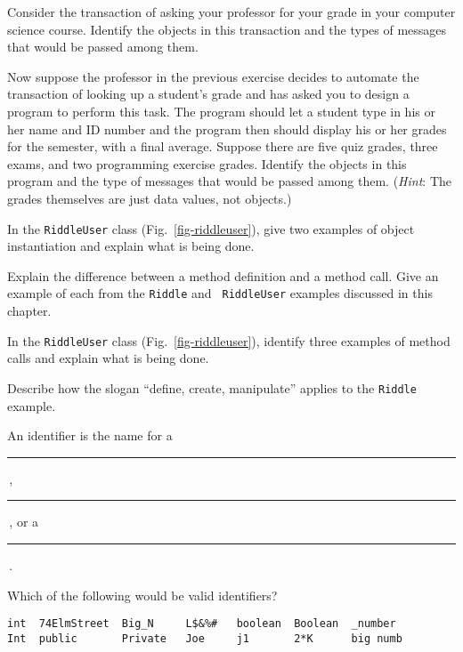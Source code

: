 \begin{EXRtwo}
\item  Consider the transaction of asking your professor for
your grade in your computer science course.  Identify the objects in
this transaction and the types of messages that would be passed among them.

\item  Now suppose the professor in the previous exercise decides
to automate the transaction of looking up a student's grade and has
asked you to design a program to perform this task. The program should
let a student type in his or her name and ID number and the program
then should display his or her grades for the semester, with a final
average. Suppose there are five quiz grades, three exams, and two
programming exercise grades.  Identify the objects in this program and the type of
messages that would be passed among them. ({\it Hint}: The grades
themselves are just data values, not objects.)

\item  In the {\tt RiddleUser} class (Fig.~\ref{fig-riddleuser}),
give two examples of object instantiation and explain what is being
done.

\item  Explain the difference between a method definition and
a method call. Give an example of each from the {\tt Riddle} and {\tt
RiddleUser} examples discussed in this chapter.

\item  In the {\tt RiddleUser} class (Fig.~\ref{fig-riddleuser}),
identify three examples of method calls and explain what is being
done.

\item  Describe how the slogan ``define, create, manipulate'' applies
to the {\tt Riddle}  example.

\item  An identifier is the name for a \rule{30pt}{0.5pt}\,, 
\rule{30pt}{0.5pt}\,,
or a \rule{30pt}{0.5pt}\,.

\item  Which of the following would be valid identifiers?

\begin{jjjlisting}
\begin{lstlisting}
int  74ElmStreet  Big_N     L$&%#   boolean  Boolean  _number
Int  public       Private   Joe     j1       2*K      big numb
\end{lstlisting}
\end{jjjlisting}


\end{EXRtwo}
